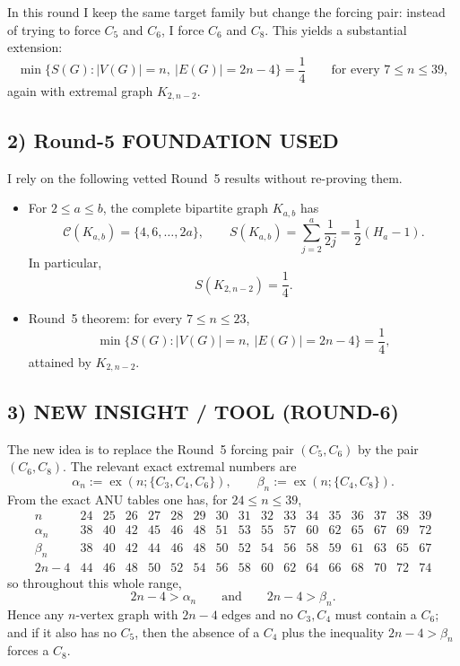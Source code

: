 In this round I keep the same target family but change the forcing pair: instead of trying to force $C_5$ and $C_6$, I force $C_6$ and $C_8$.
This yields a substantial extension:
\[
\min\{S(G): |V(G)|=n,\ |E(G)|=2n-4\}=\frac14
\qquad\text{for every }7\le n\le 39,
\]
again with extremal graph $K_{2,n-2}$.

\subsection*{2) Round-5 FOUNDATION USED}

I rely on the following vetted Round~5 results without re-proving them.

\begin{itemize}
\item[(F1)] For $2\le a\le b$, the complete bipartite graph $K_{a,b}$ has
\[
\mathcal C(K_{a,b})=\{4,6,\dots,2a\},
\qquad
S(K_{a,b})=\sum_{j=2}^a\frac1{2j}=\frac12(H_a-1).
\]
In particular,
\[
S(K_{2,n-2})=\frac14.
\]

\item[(F2)] Round~5 theorem: for every $7\le n\le 23$,
\[
\min\{S(G): |V(G)|=n,\ |E(G)|=2n-4\}=\frac14,
\]
attained by $K_{2,n-2}$.
\end{itemize}

\subsection*{3) NEW INSIGHT / TOOL (ROUND-6)}

The new idea is to replace the Round~5 forcing pair $(C_5,C_6)$ by the pair $(C_6,C_8)$.
The relevant exact extremal numbers are
\[
\alpha_n:=\operatorname{ex}(n;\{C_3,C_4,C_6\}),
\qquad
\beta_n:=\operatorname{ex}(n;\{C_4,C_8\}).
\]
From the exact ANU tables one has, for $24\le n\le 39$,
\[
\begin{array}{c|cccccccccccccccc}
 n & 24&25&26&27&28&29&30&31&32&33&34&35&36&37&38&39\\\hline
 \alpha_n & 38&40&42&45&46&48&51&53&55&57&60&62&65&67&69&72\\
 \beta_n  & 38&40&42&44&46&48&50&52&54&56&58&59&61&63&65&67\\
 2n-4      & 44&46&48&50&52&54&56&58&60&62&64&66&68&70&72&74
\end{array}
\]
so throughout this whole range,
\[
2n-4>\alpha_n
\qquad\text{and}\qquad
2n-4>\beta_n.
\]
Hence any $n$-vertex graph with $2n-4$ edges and no $C_3,C_4$ must contain a $C_6$; and if it also has no $C_5$, then the absence of a $C_4$ plus the inequality $2n-4>\beta_n$ forces a $C_8$.

